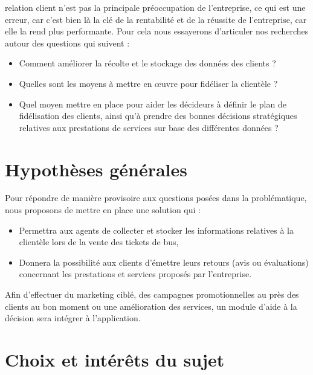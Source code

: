     relation client n’est pas la principale préoccupation de l’entreprise, ce qui est
    une erreur, car c’est bien là la clé de la rentabilité et de la réussite de l’entreprise,
    car elle la rend plus performante. Pour cela nous essayerons d’articuler nos recherches
    autour des questions qui suivent :
    \par
        \begin{itemize}
            \setlength{\itemsep}{0pt}
            \item [\ding{226}] Comment améliorer la récolte et le stockage des
            données des clients ?
            \item [\ding{226}] Quelles sont les moyens à mettre en œuvre pour fidéliser la clientèle ?
            \item [\ding{226}] Quel moyen mettre en place pour aider les décideurs à définir le plan
            de fidélisation des clients, ainsi qu'à prendre des bonnes décisions stratégiques
            relatives aux prestations de services sur base des différentes données ?
        \end{itemize}
    \section[Hypothèses générales]{Hypothèses générales}
    Pour répondre de manière provisoire aux questions posées dans la problématique,
    nous proposons de mettre en place une solution qui :
    \par
        \begin{itemize}
            \setlength{\itemsep}{0pt}
            \item [\ding{226}] Permettra aux agents de collecter
            et stocker les informations relatives à la clientèle lors de la vente
            des tickets de bus,
            \item [\ding{226}] Donnera la possibilité 
            aux clients d’émettre leurs retours (avis ou évaluations) concernant les prestations et services
            proposés par l’entreprise.
        \end{itemize}
    Afin d’effectuer du marketing ciblé, des campagnes
    promotionnelles au près des clients au bon moment ou une amélioration des services,
    un module d’aide à la décision sera intégrer à l’application.
    \section[Choix et interet du sujet]{Choix et intérêts du sujet}
